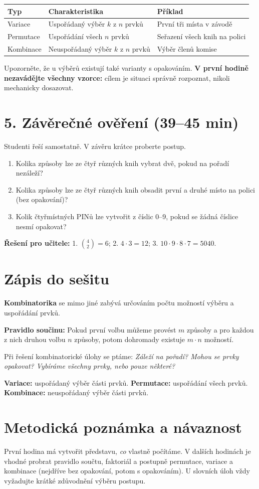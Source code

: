 \documentclass[10pt,a4paper]{article}
\newcommand{\cas}[1]{\textcolor{accent}{\bfseries #1}}
\begin{document}
\begin{tabularx}{\textwidth}{@{}p{26mm}X X@{}}\toprule
\textbf{Typ} & \textbf{Charakteristika} & \textbf{Příklad} \\\midrule
Variace & Uspořádaný výběr \(k\) z \(n\) prvků & První tři místa v závodě \\
Permutace & Uspořádání všech \(n\) prvků & Seřazení všech knih na polici \\
Kombinace & Neuspořádaný výběr \(k\) z \(n\) prvků & Výběr členů komise \\
\bottomrule\end{tabularx}

Upozorněte, že u výběrů existují také varianty s opakováním. \textbf{V první hodině nezavádějte všechny vzorce:} cílem je situaci správně rozpoznat, nikoli mechanicky dosazovat.

\section*{5. Závěrečné ověření \texorpdfstring{\cas{(39--45 min)}}{(39--45 min)}}
Studenti řeší samostatně. V závěru krátce proberte postup.
\begin{enumerate}
\item Kolika způsoby lze ze čtyř různých knih vybrat dvě, pokud na pořadí nezáleží?
\item Kolika způsoby lze ze čtyř různých knih obsadit první a druhé místo na polici (bez opakování)?
\item Kolik čtyřmístných PINů lze vytvořit z číslic 0--9, pokud se žádná číslice nesmí opakovat?
\end{enumerate}
\textbf{Řešení pro učitele:} 1. \(\binom42=6\); 2. \(4\cdot3=12\); 3. \(10\cdot9\cdot8\cdot7=5040\).

\section*{Zápis do sešitu}
\textbf{Kombinatorika} se mimo jiné zabývá určováním počtu možností výběru a uspořádání prvků.

\textbf{Pravidlo součinu:} Pokud první volbu můžeme provést \(m\) způsoby a pro každou z nich druhou volbu \(n\) způsoby, potom dohromady existuje \(m\cdot n\) možností.

Při řešení kombinatorické úlohy se ptáme: \emph{Záleží na pořadí? Mohou se prvky opakovat? Vybíráme všechny prvky, nebo pouze některé?}

\textbf{Variace:} uspořádaný výběr části prvků. \quad
\textbf{Permutace:} uspořádání všech prvků. \quad
\textbf{Kombinace:} neuspořádaný výběr části prvků.

\section*{Metodická poznámka a návaznost}
První hodina má vytvořit představu, \emph{co} vlastně počítáme. V dalších hodinách je vhodné probrat pravidlo součtu, faktoriál a postupně permutace, variace a kombinace (nejdříve bez opakování, potom s opakováním). U slovních úloh vždy vyžadujte krátké zdůvodnění výběru postupu.
\end{document}
